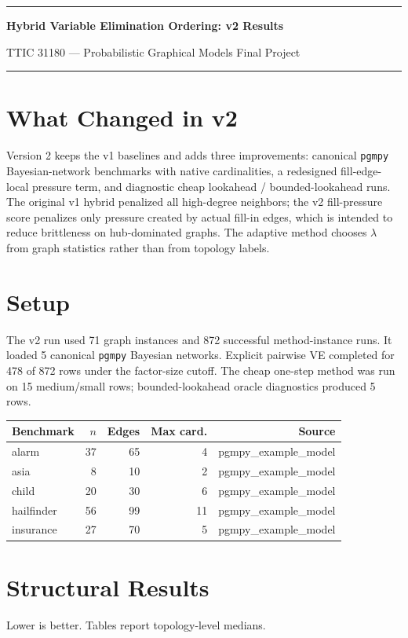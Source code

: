 \documentclass[10pt]{article}
\begin{document}
{\color{accent}\rule{\linewidth}{1.2pt}}

{\Large\bfseries Hybrid Variable Elimination Ordering: v2 Results}

{TTIC 31180 --- Probabilistic Graphical Models Final Project}

{\color{accent}\rule{\linewidth}{0.8pt}}

\section*{What Changed in v2}
Version 2 keeps the v1 baselines and adds three improvements: canonical \texttt{pgmpy} Bayesian-network benchmarks with native cardinalities, a redesigned fill-edge-local pressure term, and diagnostic cheap lookahead / bounded-lookahead runs. The original v1 hybrid penalized all high-degree neighbors; the v2 fill-pressure score penalizes only pressure created by actual fill-in edges, which is intended to reduce brittleness on hub-dominated graphs. The adaptive method chooses $\lambda$ from graph statistics rather than from topology labels.

\section*{Setup}
The v2 run used 71 graph instances and 872 successful method-instance runs. It loaded 5 canonical \texttt{pgmpy} Bayesian networks. Explicit pairwise VE completed for 478 of 872 rows under the factor-size cutoff. The cheap one-step method was run on 15 medium/small rows; bounded-lookahead oracle diagnostics produced 5 rows.

\begin{center}
{\small
\begin{tabular}{lrrrr}
\toprule
\textbf{Benchmark} & \textbf{$n$} & \textbf{Edges} & \textbf{Max card.} & \textbf{Source} \\
\midrule
alarm & 37 & 65 & 4 & pgmpy\_example\_model \\
asia & 8 & 10 & 2 & pgmpy\_example\_model \\
child & 20 & 30 & 6 & pgmpy\_example\_model \\
hailfinder & 56 & 99 & 11 & pgmpy\_example\_model \\
insurance & 27 & 70 & 5 & pgmpy\_example\_model \\
\bottomrule
\end{tabular}
}
\end{center}

\section*{Structural Results}
Lower is better. Tables report topology-level medians.
\end{document}
